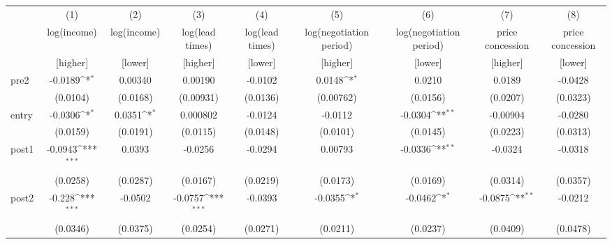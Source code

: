 {
\def\sym#1{\ifmmode^{#1}\else\(^{#1}\)\fi}
\begin{adjustbox}{max width=\textwidth}
\begin{tabular}{l*{8}{c}}
\toprule
            &\multicolumn{1}{c}{(1)}&\multicolumn{1}{c}{(2)}&\multicolumn{1}{c}{(3)}&\multicolumn{1}{c}{(4)}&\multicolumn{1}{c}{(5)}&\multicolumn{1}{c}{(6)}&\multicolumn{1}{c}{(7)}&\multicolumn{1}{c}{(8)}\\
            &\multicolumn{1}{c}{log(income)}&\multicolumn{1}{c}{log(income)}&\multicolumn{1}{c}{log(lead times)}&\multicolumn{1}{c}{log(lead times)}&\multicolumn{1}{c}{log(negotiation period)}&\multicolumn{1}{c}{log(negotiation period)}&\multicolumn{1}{c}{price concession}&\multicolumn{1}{c}{price concession}\\
&[higher]&[lower]&[higher]&[lower]&[higher]&[lower]&[higher]&[lower]\\
\midrule
pre2        &     -0.0189\sym{*}  &     0.00340         &     0.00190         &     -0.0102         &      0.0148\sym{*}  &      0.0210         &      0.0189         &     -0.0428         \\
            &    (0.0104)         &    (0.0168)         &   (0.00931)         &    (0.0136)         &   (0.00762)         &    (0.0156)         &    (0.0207)         &    (0.0323)         \\
\addlinespace
entry       &     -0.0306\sym{*}  &      0.0351\sym{*}  &    0.000802         &     -0.0124         &     -0.0112         &     -0.0304\sym{**} &    -0.00904         &     -0.0280         \\
            &    (0.0159)         &    (0.0191)         &    (0.0115)         &    (0.0148)         &    (0.0101)         &    (0.0145)         &    (0.0223)         &    (0.0313)         \\
\addlinespace
post1       &     -0.0943\sym{***}&      0.0393         &     -0.0256         &     -0.0294         &     0.00793         &     -0.0336\sym{**} &     -0.0324         &     -0.0318         \\
            &    (0.0258)         &    (0.0287)         &    (0.0167)         &    (0.0219)         &    (0.0173)         &    (0.0169)         &    (0.0314)         &    (0.0357)         \\
\addlinespace
post2       &      -0.228\sym{***}&     -0.0502         &     -0.0757\sym{***}&     -0.0393         &     -0.0355\sym{*}  &     -0.0462\sym{*}  &     -0.0875\sym{**} &     -0.0212         \\
            &    (0.0346)         &    (0.0375)         &    (0.0254)         &    (0.0271)         &    (0.0211)         &    (0.0237)         &    (0.0409)         &    (0.0478)         \\

\end{tabular}
\end{adjustbox}}
